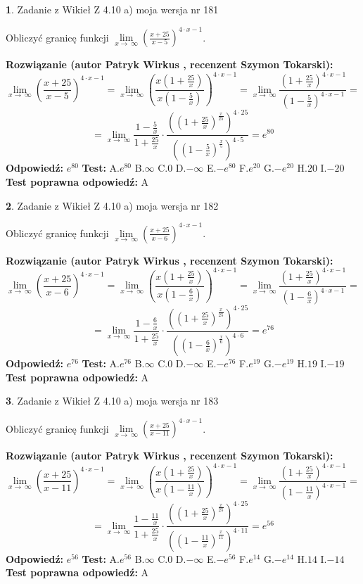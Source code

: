 \documentclass[12pt, a4paper]{article}
\theoremstyle{definition} %
\newtheorem{zad}{}
\newcommand{\zadStart}[1]{\begin{zad}#1\newline}
\newcommand{\zadStop}{\end{zad}}
\newcommand{\rozwStart}[2]{\noindent \textbf{Rozwiązanie (autor #1 , recenzent #2): }\newline}
\newcommand{\rozwStop}{\newline}
\newcommand{\odpStart}{\noindent \textbf{Odpowiedź:}\newline}
\newcommand{\odpStop}{\newline}
\newcommand{\testStart}{\noindent \textbf{Test:}\newline}
\newcommand{\testStop}{\newline}
\newcommand{\kluczStart}{\noindent \textbf{Test poprawna odpowiedź:}\newline}
\newcommand{\kluczStop}{\newline}
\begin{document}
\zadStart{Zadanie z Wikieł Z 4.10 a) moja wersja nr 181}

Obliczyć granicę funkcji  $\lim\limits_{x\to\ \infty}(\frac{x+25}{x-5})^{4\cdot x-1}$.
\zadStop
\rozwStart{Patryk Wirkus}{Szymon Tokarski}
$$\lim\limits_{x\to\ \infty}(\frac{x+25}{x-5})^{4\cdot x-1} = \lim\limits_{x\to\ \infty}(\frac{x(1+\frac{25}{x})}{x(1-\frac{5}{x})})^{4\cdot x-1}=\lim\limits_{x\to\ \infty}\frac{(1+\frac{25}{x})^{4\cdot x-1}}{(1-\frac{5}{x})^{4\cdot x-1}}=$$
$$=\lim\limits_{x\to\ \infty}\frac{1-\frac{5}{x}}{1+\frac{25}{x}}\cdot\frac{((1+\frac{25}{x})^{\frac{x}{25}})^{4\cdot25}}{((1-\frac{5}{x})^{\frac{x}{5}})^{4\cdot5}}=e^{80}$$
\rozwStop
\odpStart
$e^{80}$
\odpStop
\testStart
A.$e^{80}$ B.$\infty$ C.$0$ D.$-\infty$ E.$-e^{80}$
F.$e^{20}$ G.$-e^{20}$
H.$20$
I.$-20$
\testStop
\kluczStart
A
\kluczStop



\zadStart{Zadanie z Wikieł Z 4.10 a) moja wersja nr 182}

Obliczyć granicę funkcji  $\lim\limits_{x\to\ \infty}(\frac{x+25}{x-6})^{4\cdot x-1}$.
\zadStop
\rozwStart{Patryk Wirkus}{Szymon Tokarski}
$$\lim\limits_{x\to\ \infty}(\frac{x+25}{x-6})^{4\cdot x-1} = \lim\limits_{x\to\ \infty}(\frac{x(1+\frac{25}{x})}{x(1-\frac{6}{x})})^{4\cdot x-1}=\lim\limits_{x\to\ \infty}\frac{(1+\frac{25}{x})^{4\cdot x-1}}{(1-\frac{6}{x})^{4\cdot x-1}}=$$
$$=\lim\limits_{x\to\ \infty}\frac{1-\frac{6}{x}}{1+\frac{25}{x}}\cdot\frac{((1+\frac{25}{x})^{\frac{x}{25}})^{4\cdot25}}{((1-\frac{6}{x})^{\frac{x}{6}})^{4\cdot6}}=e^{76}$$
\rozwStop
\odpStart
$e^{76}$
\odpStop
\testStart
A.$e^{76}$ B.$\infty$ C.$0$ D.$-\infty$ E.$-e^{76}$
F.$e^{19}$ G.$-e^{19}$
H.$19$
I.$-19$
\testStop
\kluczStart
A
\kluczStop



\zadStart{Zadanie z Wikieł Z 4.10 a) moja wersja nr 183}

Obliczyć granicę funkcji  $\lim\limits_{x\to\ \infty}(\frac{x+25}{x-11})^{4\cdot x-1}$.
\zadStop
\rozwStart{Patryk Wirkus}{Szymon Tokarski}
$$\lim\limits_{x\to\ \infty}(\frac{x+25}{x-11})^{4\cdot x-1} = \lim\limits_{x\to\ \infty}(\frac{x(1+\frac{25}{x})}{x(1-\frac{11}{x})})^{4\cdot x-1}=\lim\limits_{x\to\ \infty}\frac{(1+\frac{25}{x})^{4\cdot x-1}}{(1-\frac{11}{x})^{4\cdot x-1}}=$$
$$=\lim\limits_{x\to\ \infty}\frac{1-\frac{11}{x}}{1+\frac{25}{x}}\cdot\frac{((1+\frac{25}{x})^{\frac{x}{25}})^{4\cdot25}}{((1-\frac{11}{x})^{\frac{x}{11}})^{4\cdot11}}=e^{56}$$
\rozwStop
\odpStart
$e^{56}$
\odpStop
\testStart
A.$e^{56}$ B.$\infty$ C.$0$ D.$-\infty$ E.$-e^{56}$
F.$e^{14}$ G.$-e^{14}$
H.$14$
I.$-14$
\testStop
\kluczStart
A
\kluczStop
\end{document}
